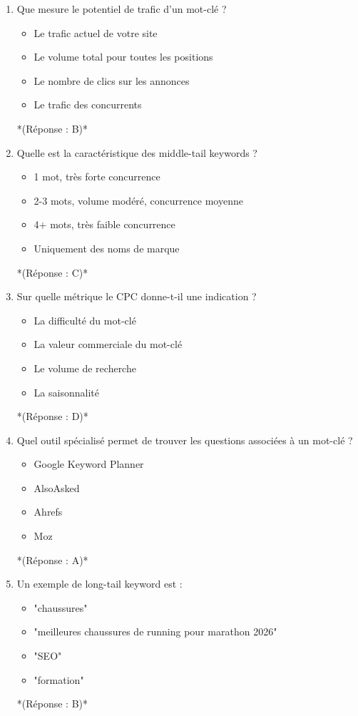 \documentclass[12pt,a4paper,twoside]{report}
\begin{document}
\begin{enumerate}
\item Que mesure le potentiel de trafic d'un mot-clé ?
\begin{itemize}
\item[A)] Le trafic actuel de votre site
\item[B)] Le volume total pour toutes les positions
\item[C)] Le nombre de clics sur les annonces
\item[D)] Le trafic des concurrents
\end{itemize}
*(Réponse : B)*

\item Quelle est la caractéristique des middle-tail keywords ?
\begin{itemize}
\item[A)] 1 mot, très forte concurrence
\item[B)] 2-3 mots, volume modéré, concurrence moyenne
\item[C)] 4+ mots, très faible concurrence
\item[D)] Uniquement des noms de marque
\end{itemize}
*(Réponse : C)*

\item Sur quelle métrique le CPC donne-t-il une indication ?
\begin{itemize}
\item[A)] La difficulté du mot-clé
\item[B)] La valeur commerciale du mot-clé
\item[C)] Le volume de recherche
\item[D)] La saisonnalité
\end{itemize}
*(Réponse : D)*

\item Quel outil spécialisé permet de trouver les questions associées à un mot-clé ?
\begin{itemize}
\item[A)] Google Keyword Planner
\item[B)] AlsoAsked
\item[C)] Ahrefs
\item[D)] Moz
\end{itemize}
*(Réponse : A)*

\item Un exemple de long-tail keyword est :
\begin{itemize}
\item[A)] "chaussures"
\item[B)] "meilleures chaussures de running pour marathon 2026"
\item[C)] "SEO"
\item[D)] "formation"
\end{itemize}
*(Réponse : B)*


\end{enumerate}
\end{document}
